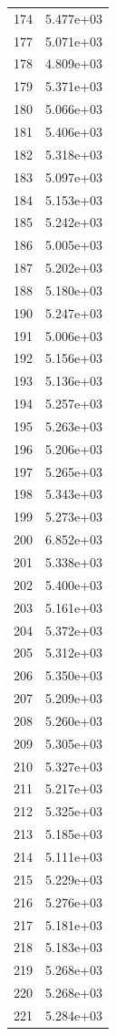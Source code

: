 \documentclass[12pt]{article}
\begin{document}
\begin{longtable}{@{}cc@{}}
174 & 5.477e+03 \\
177 & 5.071e+03 \\
178 & 4.809e+03 \\
179 & 5.371e+03 \\
180 & 5.066e+03 \\
181 & 5.406e+03 \\
182 & 5.318e+03 \\
183 & 5.097e+03 \\
184 & 5.153e+03 \\
185 & 5.242e+03 \\
186 & 5.005e+03 \\
187 & 5.202e+03 \\
188 & 5.180e+03 \\
190 & 5.247e+03 \\
191 & 5.006e+03 \\
192 & 5.156e+03 \\
193 & 5.136e+03 \\
194 & 5.257e+03 \\
195 & 5.263e+03 \\
196 & 5.206e+03 \\
197 & 5.265e+03 \\
198 & 5.343e+03 \\
199 & 5.273e+03 \\
200 & 6.852e+03 \\
201 & 5.338e+03 \\
202 & 5.400e+03 \\
203 & 5.161e+03 \\
204 & 5.372e+03 \\
205 & 5.312e+03 \\
206 & 5.350e+03 \\
207 & 5.209e+03 \\
208 & 5.260e+03 \\
209 & 5.305e+03 \\
210 & 5.327e+03 \\
211 & 5.217e+03 \\
212 & 5.325e+03 \\
213 & 5.185e+03 \\
214 & 5.111e+03 \\
215 & 5.229e+03 \\
216 & 5.276e+03 \\
217 & 5.181e+03 \\
218 & 5.183e+03 \\
219 & 5.268e+03 \\
220 & 5.268e+03 \\
221 & 5.284e+03 \\

\end{longtable}
\end{document}
